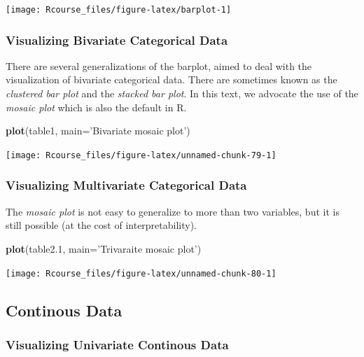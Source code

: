 \documentclass[]{book}
\newenvironment{Shaded}{\begin{snugshade}}{\end{snugshade}}
\newcommand{\KeywordTok}[1]{\textcolor[rgb]{0.13,0.29,0.53}{\textbf{{#1}}}}
\newcommand{\DataTypeTok}[1]{\textcolor[rgb]{0.13,0.29,0.53}{{#1}}}
\newcommand{\FloatTok}[1]{\textcolor[rgb]{0.00,0.00,0.81}{{#1}}}
\newcommand{\StringTok}[1]{\textcolor[rgb]{0.31,0.60,0.02}{{#1}}}
\newcommand{\NormalTok}[1]{{#1}}
\theoremstyle{definition}
\theoremstyle{definition}
\theoremstyle{remark}
\begin{document}
\texttt{[image: Rcourse\_files/figure-latex/barplot-1]}

\subsubsection{Visualizing Bivariate Categorical
Data}\label{visualizing-bivariate-categorical-data}

There are several generalizations of the barplot, aimed to deal with the
visualization of bivariate categorical data. There are sometimes known
as the \emph{clustered bar plot} and the \emph{stacked bar plot}. In
this text, we advocate the use of the \emph{mosaic plot} which is also
the default in R.

\begin{Shaded}
\begin{Highlighting}[]
\KeywordTok{plot}\NormalTok{(table1, }\DataTypeTok{main=}\StringTok{'Bivariate mosaic plot'}\NormalTok{)}
\end{Highlighting}
\end{Shaded}

\texttt{[image: Rcourse\_files/figure-latex/unnamed-chunk-79-1]}

\subsubsection{Visualizing Multivariate Categorical
Data}\label{visualizing-multivariate-categorical-data}

The \emph{mosaic plot} is not easy to generalize to more than two
variables, but it is still possible (at the cost of interpretability).

\begin{Shaded}
\begin{Highlighting}[]
\KeywordTok{plot}\NormalTok{(table2}\FloatTok{.1}\NormalTok{, }\DataTypeTok{main=}\StringTok{'Trivaraite mosaic plot'}\NormalTok{)}
\end{Highlighting}
\end{Shaded}

\texttt{[image: Rcourse\_files/figure-latex/unnamed-chunk-80-1]}

\subsection{Continous Data}\label{continous-data-1}

\subsubsection{Visualizing Univariate Continous
Data}\label{visualizing-univariate-continous-data}
\end{document}
